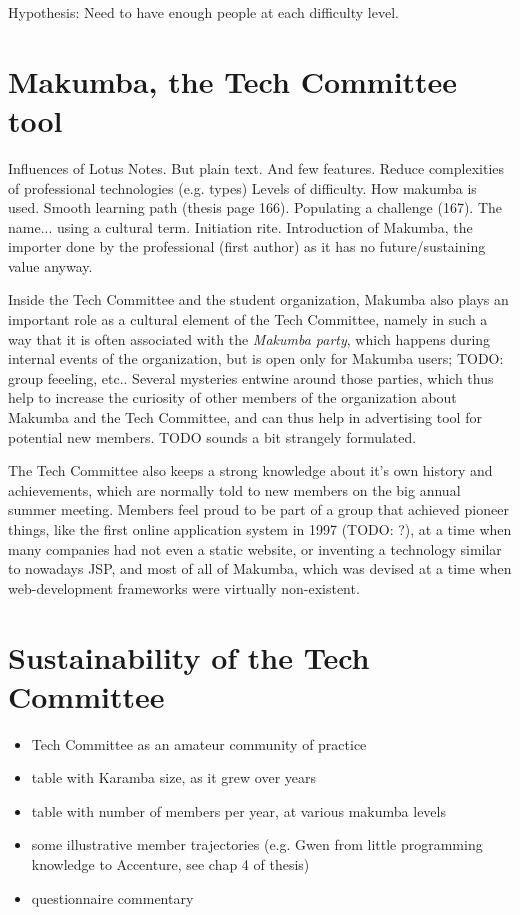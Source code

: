 \documentclass{acm_proc_article-sp}
\begin{document}
Hypothesis: Need to have enough people at each difficulty level.

\section{Makumba, the Tech Committee tool}\label{sec:makumba}
Influences of Lotus Notes.
But plain text.
And few features.
Reduce complexities of professional technologies (e.g. types)
Levels of difficulty. How makumba is used. Smooth learning path (thesis page 166).
Populating a challenge (167).
The name... using a cultural term. Initiation rite. 
Introduction of Makumba, the importer done by the professional (first author) as it has no future/sustaining value anyway.

Inside the Tech Committee and the student organization, Makumba also plays an important role as a cultural element of the Tech Committee, namely in such a way that it is often associated with the \textit{Makumba party}, which happens during internal events of the organization, but is open only for Makumba users; TODO: group feeeling, etc.. 
Several mysteries entwine around those parties, which thus help to increase the curiosity of other members of the organization about Makumba and the Tech Committee, and can thus help in advertising tool for potential new members. TODO sounds a bit strangely formulated.

The Tech Committee also keeps a strong knowledge about it's own history and achievements, which are normally told to new members on the big annual summer meeting. Members feel proud to be part of a group that achieved pioneer things, like the first online application system in 1997 (TODO: ?), at a time when many companies had not even a static website, or inventing a technology similar to nowadays JSP, and most of all of Makumba, which was devised at a time when web-development frameworks were virtually non-existent.

\section{Sustainability of the Tech Committee}\label{sec:techCommittee}
\begin{itemize}
\item Tech Committee as an amateur community of practice
\item table with Karamba size, as it grew over years
\item table with number of members per year, at various makumba levels
\item some illustrative member trajectories (e.g. Gwen from little programming knowledge to Accenture, see chap 4 of thesis)
\item questionnaire commentary
\end{itemize}
\end{document}
